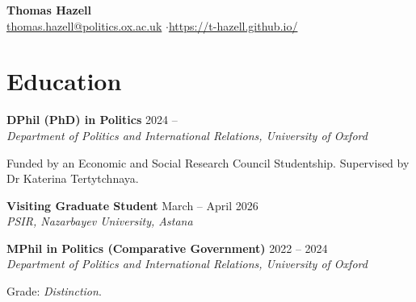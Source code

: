 \documentclass[10pt, a4paper]{article}
\begin{document}
\begin{center}
  {\LARGE\bfseries Thomas Hazell}\\[6pt]
  \url{thomas.hazell@politics.ox.ac.uk} \enspace$\cdot$\enspace \url{https://t-hazell.github.io/}
\end{center}

\vspace{8pt}


\section{Education}

\begin{samepage}
  \textbf{DPhil (PhD) in Politics} \hfill 2024 -- \phantom{2027}\\
  \textit{Department of Politics and International Relations, University of Oxford}

Funded by an Economic and Social Research Council Studentship. Supervised by Dr Katerina Tertytchnaya.
\end{samepage}

\begin{samepage}
  \textbf{Visiting Graduate Student} \hfill March -- April 2026\\
  \textit{PSIR, Nazarbayev University, Astana}
\end{samepage}

\begin{samepage}
  \textbf{MPhil in Politics (Comparative Government)} \hfill 2022 -- 2024\\
  \textit{Department of Politics and International Relations, University of Oxford}

Grade: \textit{Distinction}.
\end{samepage}
\end{document}
